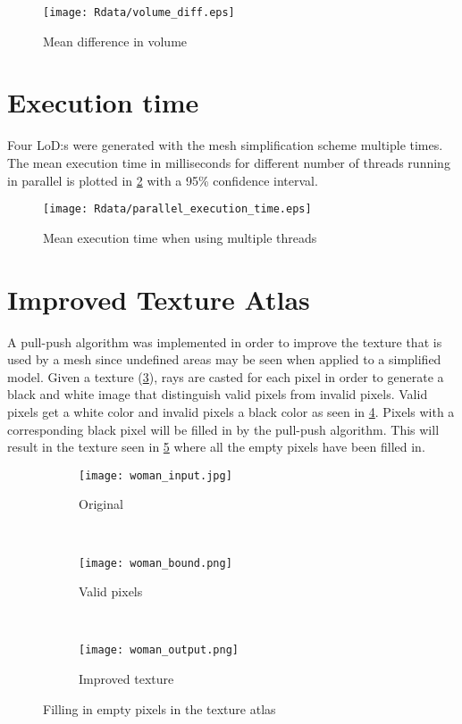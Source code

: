 \begin{figure}[ht]
  \centering
  \texttt{[image: Rdata/volume\_diff.eps]}
  \caption{Mean difference in volume}
  \label{fig:volume_diff}
\end{figure}

\clearpage

\section{Execution time}
Four LoD:s were generated with the mesh simplification scheme multiple times. The mean execution time in milliseconds for different number of threads running in parallel is plotted in \cref{fig:execution_time} with a 95\% confidence interval.

\begin{figure}[ht]
  \centering
  \texttt{[image: Rdata/parallel\_execution\_time.eps]}
  \caption{Mean execution time when using multiple threads}
  \label{fig:execution_time}
\end{figure}

\clearpage

\section{Improved Texture Atlas}
A pull-push algorithm was implemented in order to improve the texture that is used by a mesh since undefined areas may be seen when applied to a simplified model. Given a texture (\cref{fig:original_texture_atlas}), rays are casted for each pixel in order to generate a black and white image that distinguish valid pixels from invalid pixels. Valid pixels get a white color and invalid pixels a black color as seen in \cref{fig:valid_pixels}. Pixels with a corresponding black pixel will be filled in by the pull-push algorithm. This will result in the texture seen in \cref{fig:improved_texture} where all the empty pixels have been filled in.

\begin{figure}[ht]
  \centering
  \begin{subfigure}[b]{.3\textwidth} 
    \texttt{[image: woman\_input.jpg]}
    \caption{Original}
    \label{fig:original_texture_atlas}
  \end{subfigure}
  ~
  \begin{subfigure}[b]{.3\textwidth}
    \texttt{[image: woman\_bound.png]}
    \caption{Valid pixels}
    \label{fig:valid_pixels}
  \end{subfigure}
  ~
  \begin{subfigure}[b]{.3\textwidth}
    \texttt{[image: woman\_output.png]}
    \caption{Improved texture}
    \label{fig:improved_texture}
  \end{subfigure}
  \caption{Filling in empty pixels in the texture atlas}
  \label{fig:improve_texture_atlas}
\end{figure}


